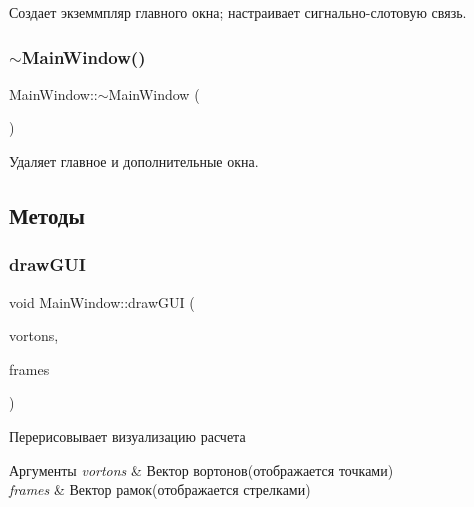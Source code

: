 Создает экземмпляр главного окна; настраивает сигнально-\/слотовую связь. \mbox{\label{class_main_window_ae98d00a93bc118200eeef9f9bba1dba7}} 
\subsubsection{\texorpdfstring{$\sim$\+Main\+Window()}{~MainWindow()}}
{\footnotesize\ttfamily Main\+Window\+::$\sim$\+Main\+Window (\begin{DoxyParamCaption}{ }\end{DoxyParamCaption})}

Удаляет главное и дополнительные окна. 

\subsection{Методы}
\mbox{\label{class_main_window_a0d01ad34f4f5610bc2e131244ec873cc}} 
\subsubsection{\texorpdfstring{draw\+G\+UI}{drawGUI}}
{\footnotesize\ttfamily void Main\+Window\+::draw\+G\+UI (\begin{DoxyParamCaption}\item[{const Q\+Vector$<$ \mbox{\hyperlink{class_vorton}{Vorton}} $>$ \&}]{vortons,  }\item[{const Q\+Vector$<$ std\+::shared\+\_\+ptr$<$ \mbox{\hyperlink{class_multi_frame}{Multi\+Frame}} $>$$>$ \&}]{frames }\end{DoxyParamCaption})\hspace{0.3cm}{\ttfamily [slot]}}

Перерисовывает визуализацию расчета 
\begin{DoxyParams}{Аргументы}
{\em vortons} & Вектор вортонов(отображается точками) \\
\hline
{\em frames} & Вектор рамок(отображается стрелками) \\
\hline
\end{DoxyParams}
\mbox{\label{class_main_window_a177cdb1b7d2ca13356de0829a66a98c3}} 
